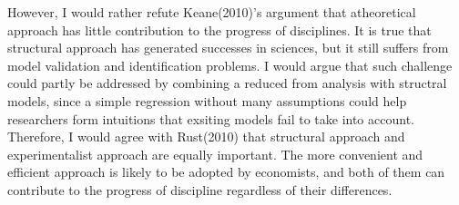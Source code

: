 \documentclass[letterpaper,12pt]{article}
\theoremstyle{definition}
\begin{document}
However, I would rather refute Keane(2010)'s argument that atheoretical approach has little contribution to the progress of disciplines. It is true that structural approach has generated successes in sciences, but it still suffers from model validation and identification problems. I would argue that such challenge could partly be addressed by combining a reduced from analysis with structral models, since a simple regression without many assumptions could help researchers form intuitions that exsiting models fail to take into account. Therefore, I would agree with Rust(2010) that structural approach and experimentalist approach are equally important. The more convenient and efficient approach is likely to be adopted by economists, and both of them can contribute to the progress of discipline regardless of their differences.


\nocite{*}
\end{document}

